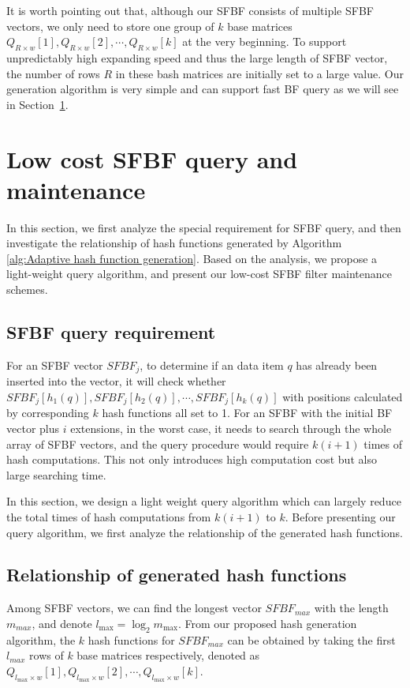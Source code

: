 \documentclass[10pt,journal,letterpaper]{IEEEtran}
\begin{document}
It is worth pointing out that, although our SFBF consists of multiple SFBF vectors,
we only need to store one group of $k$ base matrices ${Q_{R \times w}}[1],{Q_{R \times w}}[2], \cdots ,{Q_{R \times w}}[k]$ at the very beginning. To support unpredictably high expanding speed and thus the large length of SFBF vector, the number of rows $R$ in these bash matrices are initially set to a large value.
Our generation algorithm is very simple and can support fast BF query as we will see in Section~\ref{sec: Low Cost Information Query and Data Maintenance}.

\section{Low cost SFBF query and maintenance}
\label{sec: Low Cost Information Query and Data Maintenance}
In this section, we first analyze the special requirement for SFBF query, and then investigate the relationship of
hash functions generated by Algorithm \ref{alg:Adaptive hash function generation}. Based on the analysis, we propose a light-weight query algorithm, and present our low-cost SFBF filter maintenance schemes.

\subsection{SFBF query requirement}
For an SFBF vector $SFBF_j$, to determine if an data item $q$ has already been inserted into the vector, it will check whether $SFBF_j[{h_1}\left( {{q}} \right)],SFBF_j[{h_2}\left( {{q}} \right)], \cdots, SFBF_j[{h_k}\left( {{q}} \right)]$ with positions calculated by corresponding $k$ hash functions all set to 1. For an SFBF with the initial BF vector plus $i$ extensions, in the worst case, it needs to search through the whole array of SFBF vectors, and the query procedure would require $k(i+1)$ times of hash computations. This not only introduces high computation cost but also large searching time.

In this section, we design a light weight query algorithm which can largely reduce the total times of hash computations  from $k(i+1)$ to $k$. Before  presenting our query algorithm, we first analyze the relationship of the generated hash functions.

\subsection{Relationship of generated hash functions}
Among SFBF vectors, we can find the longest vector $SFBF_{max}$ with the length $m_{max}$, and denote ${l_{\max }} = {\log _2}{m_{\max }}$. From our proposed hash generation algorithm, the $k$ hash functions for $SFBF_{max}$ can be obtained by taking the first $l_{max}$ rows of $k$ base matrices respectively, denoted as ${Q_{{l_{\max }} \times w}}[1],{Q_{{l_{\max }} \times w}}[2], \cdots ,{Q_{{l_{\max }} \times w}}[k]$.
\end{document}
